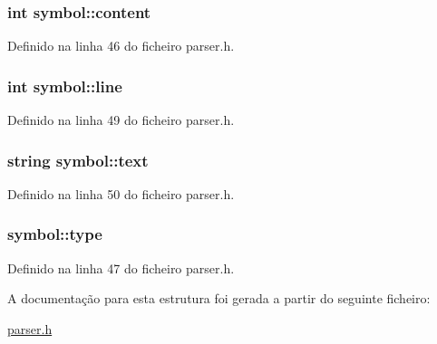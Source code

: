 \hypertarget{structsymbol_a72c61f7152e8fadf84f1d13136ba741b}{
\subsubsection[{content}]{\setlength{\rightskip}{0pt plus 5cm}int symbol\-::content}}\label{structsymbol_a72c61f7152e8fadf84f1d13136ba741b}


Definido na linha 46 do ficheiro parser.\-h.

\hypertarget{structsymbol_a9080179a3d7c5bbfaf9de1817f00c2c7}{
\subsubsection[{line}]{\setlength{\rightskip}{0pt plus 5cm}int symbol\-::line}}\label{structsymbol_a9080179a3d7c5bbfaf9de1817f00c2c7}


Definido na linha 49 do ficheiro parser.\-h.

\hypertarget{structsymbol_ad8fc4d46c20c78f051903a5d06151e86}{
\subsubsection[{text}]{\setlength{\rightskip}{0pt plus 5cm}string symbol\-::text}}\label{structsymbol_ad8fc4d46c20c78f051903a5d06151e86}


Definido na linha 50 do ficheiro parser.\-h.

\hypertarget{structsymbol_adba0eaeb4bfbf4787bd3899e4202cc90}{
\subsubsection[{type}]{ symbol\-::type}}\label{structsymbol_adba0eaeb4bfbf4787bd3899e4202cc90}


Definido na linha 47 do ficheiro parser.\-h.



A documentação para esta estrutura foi gerada a partir do seguinte ficheiro\-:\begin{DoxyCompactItemize}
\item 
\hyperlink{parser_8h}{parser.\-h}\end{DoxyCompactItemize}
